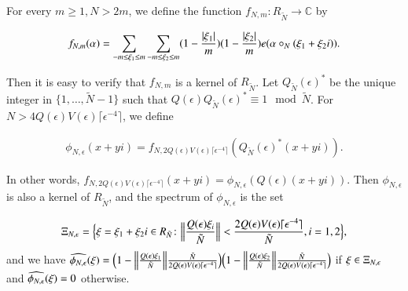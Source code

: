 \documentclass[12pt,amstex]{amsart}
\theoremstyle{definition}
\def \A {\alpha}
\def \e {\epsilon}
\def \R {R_{\tilde{N}}}
\def \x {\bold{\xi}}
\begin{document}
For every $m\geq 1, N>2m$, we define the function $f_{N,m}\colon \R\rightarrow\mathbb{C}$ by

  \begin{equation}\nonumber
  \begin{split}
   f_{N,m}(\A)=\sum_{-m\leq\xi_{1}\leq m}\sum_{-m\leq\xi_{2}\leq m}(1-\frac{\vert\xi_{1}\vert}{m})(1-\frac{\vert\xi_{2}\vert}{m})e(\A\circ_{N}(\x_{1}+\x_{2}i)).
  \end{split}
\end{equation}

Then it is easy to verify that $f_{N,m}$ is a kernel of $\R$. Let $Q_{\tilde{N}}(\e)^{*}$ be the unique integer in $\{1,\dots,\tilde{N}-1\}$ such that $Q(\e)Q_{\tilde{N}}(\e)^{*}\equiv 1\mod \tilde{N}$. For $N>4Q(\e)V(\e)\lceil\e^{-4}\rceil$, we define

  \begin{equation}\label{phi}
  \begin{split}
   \phi_{N,\e}(x+yi)=f_{N,2Q(\e)V(\e)\lceil\e^{-4}\rceil}(Q_{\tilde{N}}(\e)^{*}(x+yi)).
  \end{split}
\end{equation}

In other words, $f_{N,2Q(\e)V(\e)\lceil\e^{-4}\rceil}(x+yi)=\phi_{N,\e}(Q(\e)(x+yi))$. Then $\phi_{N,\e}$ is also a kernel of $\R$, and the spectrum of $\phi_{N,\e}$ is the set

  \begin{equation}\nonumber
  \begin{split}
   \Xi_{N,\e}=\Bigl\{\x=\xi_{1}+\xi_{2}i\in \R\colon\Bigl\Vert\frac{Q(\e)\xi_{i}}{\tilde{N}}\Bigr\Vert<\frac{2Q(\e)V(\e)\lceil\e^{-4}\rceil}{\tilde{N}}, i=1,2\Bigr\},
  \end{split}
\end{equation}
and we have $\widehat{\phi_{N,\e}}(\x)=\Bigl(1-\Bigl\Vert\frac{Q(\e)\xi_{1}}{\tilde{N}}\Bigr\Vert\frac{\tilde{N}}{2Q(\e)V(\e)\lceil\e^{-4}\rceil}\Bigr)
            \Bigl(1-\Bigl\Vert\frac{Q(\e)\xi_{2}}{\tilde{N}}\Bigr\Vert\frac{\tilde{N}}{2Q(\e)V(\e)\lceil\e^{-4}\rceil}\Bigr)$ if $\x\in\Xi_{N,\e}$ and $\widehat{\phi_{N,\e}}(\x)=0$ otherwise.
\end{document}
